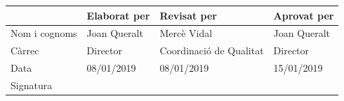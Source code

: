 \documentclass[fontsize=10pt,%
paper=a4,%
DIV=14,%
twoside=semi,%
pagesize=auto,%
parskip=half,
captions=tableheading,%
numbers=noenddot,%
toc=graduated%
]{scrartcl}
\renewcommand{\arraystretch}{1.75}%
\renewcommand{\arraystretch}{1.75}%
\begin{document}
\begin{center}\scriptsize\sffamily
\renewcommand{\arraystretch}{1.75}%
\begin{tabular}{p{3cm}p{3cm}p{3cm}p{3cm}}\hline
              & Elaborat per & Revisat per             & Aprovat per  \\ \hline
Nom i cognoms & Joan Queralt & Mercè Vidal             & Joan Queralt \\
Càrrec        & Director     & Coordinació de Qualitat & Director     \\
Data          & 08/01/2019   & 08/01/2019              & 15/01/2019   \\\hline
Signatura     &              &                         &
\end{tabular}
\end{center}
\end{document}
